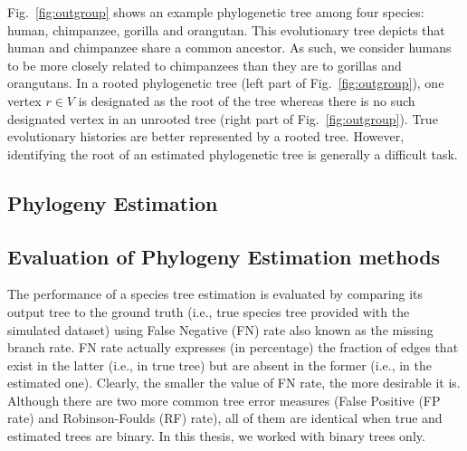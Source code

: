 Fig.~\ref{fig:outgroup} shows an example phylogenetic tree among four species: human, chimpanzee, gorilla and orangutan. This evolutionary tree depicts that human and chimpanzee share a common ancestor. As such, we consider humans to be more closely related to chimpanzees than they are to gorillas and orangutans.
In a rooted phylogenetic tree (left part of Fig.~\ref{fig:outgroup}), one vertex $r \in V$ is designated as the root of the tree whereas there is no such designated vertex in an unrooted tree (right part of Fig.~\ref{fig:outgroup}). True evolutionary histories are better represented by a rooted tree. However, identifying the root of an estimated phylogenetic tree is generally a difficult task.

\subsection{Phylogeny Estimation}

\subsection{Evaluation of Phylogeny Estimation methods}\label{sec:phyPerf}
The performance of a species tree estimation is evaluated by comparing its output tree to the ground truth (i.e., true species tree provided with the simulated dataset) using False Negative (FN) rate also known as the missing branch rate. FN rate actually expresses (in percentage) the fraction of edges that exist in the latter (i.e., in true tree) but are absent in the former (i.e., in the estimated one). Clearly, the smaller the
value of FN rate, the more desirable it is. Although there are two more common tree error measures (False Positive (FP rate) and Robinson-Foulds (RF) rate), all of them are identical when true and estimated trees are binary. In this thesis, we worked with binary trees only.

